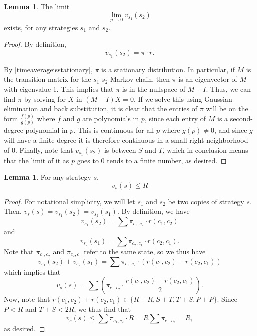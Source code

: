 \documentclass[11pt]{amsart}
\theoremstyle{definition}
\newtheorem{lemma}[theorem]{Lemma}
\theoremstyle{remark}
\begin{document}
\begin{lemma}
  \label{limitvexists}
  The limit \begin{equation*}
    \lim_{p \to 0} v_{s_1}(s_2)
  \end{equation*}
  exists, for any strategies $s_1$ and $s_2$.
\end{lemma}
\begin{proof}
  By definition, \begin{equation*}
    v_{s_1}(s_2) = \pi \cdot r.
  \end{equation*}

  By \cref{timeaverageisstationary}, $\pi$ is a stationary distribution. In particular, if $M$ is the transition matrix for the $s_1$-$s_2$ Markov chain, then $\pi$ is an eigenvector of $M$ with eigenvalue 1. This implies that $\pi$ is in the nullspace of $M - I$. Thus, we can find $\pi$ by solving for $X$ in $(M - I)X = 0$. If we solve this using Gaussian elimination and back substitution, it is clear that the entries of $\pi$ will be on the form $\frac{f(p)}{g(p)}$ where $f$ and $g$ are polynomials in $p$, since each 
  entry of $M$ is a second-degree polynomial in $p$. This is continuous for all $p$ where $g(p) \neq 0$, and since $g$ will have a finite degree it is therefore continuous in a small right neighborhood of 0. Finally, note that $v_{s_1}(s_2)$ is between $S$ and $T$, which in conclusion means that the limit of it as $p$ goes to 0 tends to a finite number, as desired.
\end{proof}

\begin{lemma}
  \label{neverbetterthanr}
  For any strategy $s$,
  \begin{equation*}
    v_{s}(s) \leq R
  \end{equation*}
\end{lemma}
\begin{proof}
  For notational simplicity, we will let $s_1$ and $s_2$ be two copies of strategy $s$. Then, $v_{s}(s) = v_{s_1}(s_2) = v_{s_2}(s_1)$. By definition, we have
  \begin{equation*}
    v_{s_1}(s_2) = \sum \pi_{c_1,c_2} \cdot r(c_1, c_2)
  \end{equation*}
  and
  \begin{equation*}
    v_{s_2}(s_1) = \sum \pi_{c_2,c_1} \cdot r(c_2, c_1).
  \end{equation*}
  Note that $\pi_{c_1,c_2}$ and $\pi_{c_2,c_1}$ refer to the same state, so we thus have \begin{equation*}
    v_{s_1}(s_2) + v_{s_2}(s_1) = \sum \pi_{c_1,c_2} \cdot (r(c_1,c_2) + r(c_2,c_1))
  \end{equation*}
  which implies that \begin{equation*}
    v_s(s) = \sum \left( \pi_{c_1,c_2} \cdot \frac{r(c_1,c_2) + r(c_2,c_1)}{2} \right).
  \end{equation*}
  Now, note that $r(c_1,c_2) + r(c_2,c_1) \in \{R + R, S + T, T+S, P + P\}$. Since $P < R$ and $T + S < 2R$, we thus find that \begin{equation*}
    v_s(s) \leq \sum \pi_{c_1,c_2} \cdot R = R \sum \pi_{c_1,c_2} = R,
  \end{equation*}
  as desired.
\end{proof}
\end{document}
